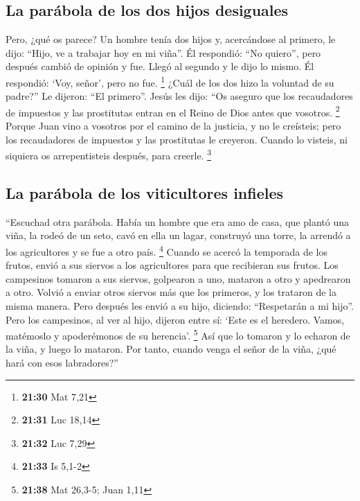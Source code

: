 \begin{paracol}{2}
\hypertarget{la-paruxe1bola-de-los-dos-hijos-desiguales}{%
\subsection{La parábola de los dos hijos
desiguales}\label{la-paruxe1bola-de-los-dos-hijos-desiguales}}

 Pero, ¿qué os parece? Un hombre tenía dos hijos y,
acercándose al primero, le dijo: ``Hijo, ve a trabajar hoy en mi viña''.
 Él respondió: ``No quiero'', pero después cambió de
opinión y fue.  Llegó al segundo y le dijo lo mismo. Él
respondió: `Voy, señor', pero no fue. \footnote{\textbf{21:30} Mat 7,21}
 ¿Cuál de los dos hizo la voluntad de su padre?'' Le
dijeron: ``El primero''. Jesús les dijo: ``Os aseguro que los
recaudadores de impuestos y las prostitutas entran en el Reino de Dios
antes que vosotros. \footnote{\textbf{21:31} Luc 18,14} 
Porque Juan vino a vosotros por el camino de la justicia, y no le
creísteis; pero los recaudadores de impuestos y las prostitutas le
creyeron. Cuando lo visteis, ni siquiera os arrepentisteis después, para
creerle. \footnote{\textbf{21:32} Luc 7,29}

\hypertarget{la-paruxe1bola-de-los-viticultores-infieles}{%
\subsection{La parábola de los viticultores
infieles}\label{la-paruxe1bola-de-los-viticultores-infieles}}

 ``Escuchad otra parábola. Había un hombre que era amo de
casa, que plantó una viña, la rodeó de un seto, cavó en ella un lagar,
construyó una torre, la arrendó a los agricultores y se fue a otro país.
\footnote{\textbf{21:33} Is 5,1-2}  Cuando se acercó la
temporada de los frutos, envió a sus siervos a los agricultores para que
recibieran sus frutos.  Los campesinos tomaron a sus
siervos, golpearon a uno, mataron a otro y apedrearon a otro.
 Volvió a enviar otros siervos más que los primeros, y
los trataron de la misma manera.  Pero después les envió
a su hijo, diciendo: ``Respetarán a mi hijo''.  Pero los
campesinos, al ver al hijo, dijeron entre sí: `Este es el heredero.
Vamos, matémoslo y apoderémonos de su herencia'. \footnote{\textbf{21:38}
  Mat 26,3-5; Juan 1,11}  Así que lo tomaron y lo echaron
de la viña, y luego lo mataron.  Por tanto, cuando venga
el señor de la viña, ¿qué hará con esos labradores?''


\end{paracol}
